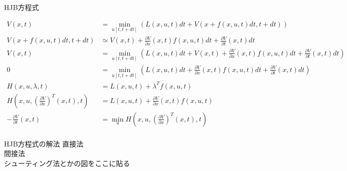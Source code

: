 \documentclass[dvipdfmx,12pt]{beamer}
\begin{document}
    \begin{frame}{HJB方程式}
        \fontsize{6.5pt}{8.5pt}\selectfont

        \begin{align*}
            V(x, t) &= \min_{u[t, t+dt]} \left( L(x, u, t) dt + V \left( x + f(x, u, t) dt, t + dt \right) \right) \\
            V \left( x + f(x, u, t) dt, t + dt \right) &\simeq V \left(x, t\right) + \frac{\partial V}{\partial x}\left(x, t\right)f\left(x, u, t\right)dt + \frac{\partial V}{\partial t}\left(x, t\right)dt \\
            V(x, t) &= \min_{u[t, t+dt]} \left( L(x, u, t) dt + V \left(x, t\right) + \frac{\partial V}{\partial x}\left(x, t\right)f\left(x, u, t\right)dt + \frac{\partial V}{\partial t}\left(x, t\right)dt \right) \\
            0&=\min_{u[t, t+dt]} \left( L(x, u, t) dt + \frac{\partial V}{\partial x}\left(x, t\right)f\left(x, u, t\right)dt + \frac{\partial V}{\partial t}\left(x, t\right)dt \right) \\
            H(x, u, \lambda, t) &= L(x, u, t) + \lambda^T f(x, u, t) \\
            H\left(x, u, \left( \frac{\partial V}{\partial x} \right)^T\left(x, t\right), t \right) &= L(x, u, t) + \frac{\partial V}{\partial x}\left(x, t\right)f\left(x, u, t\right) \\
            -\frac{\partial V}{\partial t}\left(x,t\right) &= \min _u H\left(x, u, \left( \frac{\partial V}{\partial x} \right)^T\left(x, t\right), t \right) \\
        \end{align*}
    \end{frame}

    \begin{frame}{HJB方程式の解法}
        直接法\\
        間接法\\
        シューティング法とかの図をここに貼る \\
    \end{frame}
\end{document}
